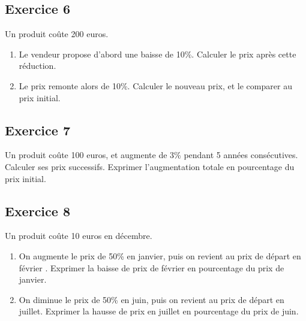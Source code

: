 \documentclass[12 pt]{extarticle}
\theoremstyle{plain}
\begin{document}
\subsection*{Exercice 6}

Un produit coûte 200 euros. 

\begin{enumerate}
\item Le vendeur propose d'abord une baisse de 10\%. Calculer le prix après cette réduction. 

\item Le prix remonte alors de 10\%. Calculer le nouveau prix, et le comparer au prix initial. 
\end{enumerate}

\subsection*{Exercice 7}

Un produit coûte 100 euros, et augmente de 3\% pendant 5 années consécutives. Calculer ses prix successifs. Exprimer l'augmentation totale en pourcentage du prix initial. 

\subsection*{Exercice 8}

Un produit coûte 10 euros en décembre.
\begin{enumerate}
\item On augmente le prix de 50\% en janvier, puis on revient au prix de départ en février . Exprimer la baisse de prix de février en pourcentage du prix de janvier.
\item On diminue le prix de 50\% en juin, puis on revient au prix de départ en juillet. 
Exprimer la hausse de prix en juillet en pourcentage du prix de juin.
\end{enumerate}

%
%
%
%
 	
\end{document}
